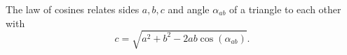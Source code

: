 The law of cosines relates sides $a, b, c$ and angle $\alpha_{ab}$ of a triangle to each other with
\[
  c = \sqrt{
    a^2 + b^2 - 2ab 
    \cos( \alpha_{ab} )
  }.
\]